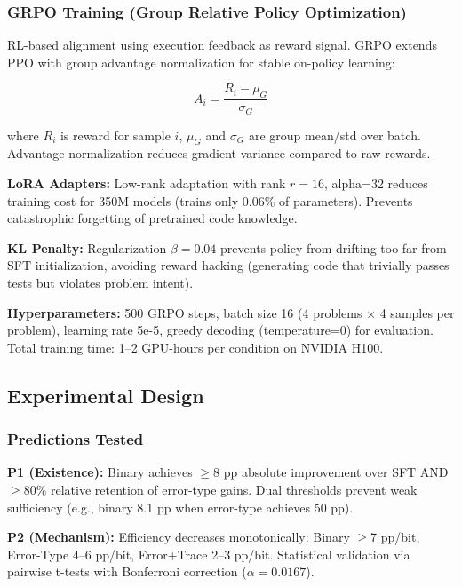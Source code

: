 \subsubsection{GRPO Training (Group Relative Policy Optimization)}

RL-based alignment using execution feedback as reward signal. GRPO \cite{shao2024group} extends PPO with group advantage normalization for stable on-policy learning:

\begin{equation}
A_i = \frac{R_i - \mu_G}{\sigma_G}
\end{equation}

where $R_i$ is reward for sample $i$, $\mu_G$ and $\sigma_G$ are group mean/std over batch. Advantage normalization reduces gradient variance compared to raw rewards.

\textbf{LoRA Adapters:} Low-rank adaptation \cite{hu2021lora} with rank $r=16$, alpha=32 reduces training cost for 350M models (trains only 0.06\% of parameters). Prevents catastrophic forgetting of pretrained code knowledge.

\textbf{KL Penalty:} Regularization $\beta=0.04$ prevents policy from drifting too far from SFT initialization, avoiding reward hacking (generating code that trivially passes tests but violates problem intent).

\textbf{Hyperparameters:} 500 GRPO steps, batch size 16 (4 problems $\times$ 4 samples per problem), learning rate 5e-5, greedy decoding (temperature=0) for evaluation. Total training time: 1--2 GPU-hours per condition on NVIDIA H100.

\subsection{Experimental Design}

\subsubsection{Predictions Tested}

\textbf{P1 (Existence):} Binary achieves $\geq$8 pp absolute improvement over SFT AND $\geq$80\% relative retention of error-type gains. Dual thresholds prevent weak sufficiency (e.g., binary 8.1 pp when error-type achieves 50 pp).

\textbf{P2 (Mechanism):} Efficiency decreases monotonically: Binary $\geq$7 pp/bit, Error-Type 4--6 pp/bit, Error+Trace 2--3 pp/bit. Statistical validation via pairwise t-tests with Bonferroni correction ($\alpha=0.0167$).


